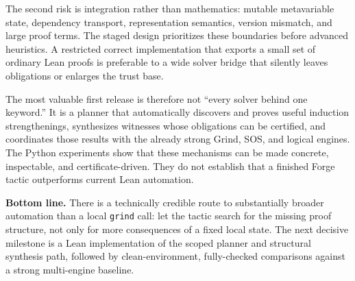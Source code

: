 \documentclass[11pt,a4paper]{article}
\newcommand{\code}[1]{\texttt{#1}}
\begin{document}
The second risk is integration rather than mathematics: mutable metavariable
state, dependency transport, representation semantics, version mismatch, and
large proof terms. The staged design prioritizes these boundaries before
advanced heuristics. A restricted correct implementation that exports a small
set of ordinary Lean proofs is preferable to a wide solver bridge that silently
leaves obligations or enlarges the trust base.

The most valuable first release is therefore not ``every solver behind one
keyword.'' It is a planner that automatically discovers and proves useful
induction strengthenings, synthesizes witnesses whose obligations can be
certified, and coordinates those results with the already strong Grind, SOS,
and logical engines. The Python experiments show that these mechanisms can be
made concrete, inspectable, and certificate-driven. They do not establish that
a finished Forge tactic outperforms current Lean automation.

\textbf{Bottom line.} There is a technically credible route to substantially
broader automation than a local \code{grind} call: let the tactic search for the
missing proof structure, not only for more consequences of a fixed local
state. The next decisive milestone is a Lean implementation of the scoped
planner and structural synthesis path, followed by clean-environment,
fully-checked comparisons against a strong multi-engine baseline.

\appendix
\end{document}
